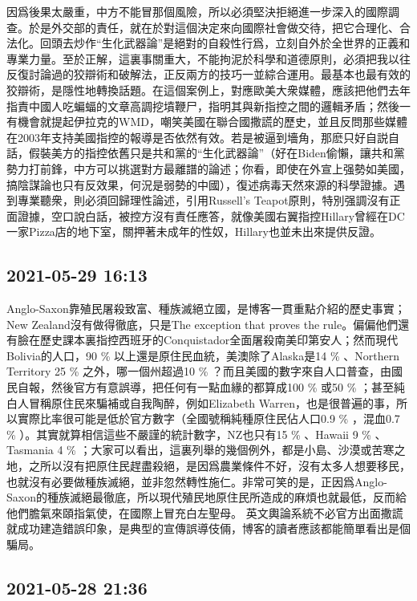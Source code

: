 \documentclass[twocolumn]{ctexart}
\begin{document}
因爲後果太嚴重，中方不能冒那個風險，所以必須堅決拒絕進一步深入的國際調查。於是外交部的責任，就在於對這個決定來向國際社會做交待，把它合理化、合法化。回頭去炒作“生化武器論”是絕對的自殺性行爲，立刻自外於全世界的正義和專業力量。至於正解，這裏事關重大，不能拘泥於科學和道德原則，必須把我以往反復討論過的狡辯術和破解法，正反兩方的技巧一並綜合運用。最基本也最有效的狡辯術，是隱性地轉換話題。在這個案例上，對應歐美大衆媒體，應該把他們去年指責中國人吃蝙蝠的文章高調挖墳鞭尸，指明其與新指控之間的邏輯矛盾；然後一有機會就提起伊拉克的WMD，嘲笑美國在聯合國撒謊的歷史，並且反問那些媒體在2003年支持美國指控的報導是否依然有效。若是被逼到墻角，那麽只好自説自話，假裝美方的指控依舊只是共和黨的“生化武器論”（好在Biden偷懶，讓共和黨勢力打前鋒，中方可以挑選對方最離譜的論述；你看，即使在外宣上强勢如美國，搞陰謀論也只有反效果，何況是弱勢的中國），復述病毒天然來源的科學證據。遇到專業聽衆，則必須回歸理性論述，引用Russell’s Teapot原則，特別强調沒有正面證據，空口說白話，被控方沒有責任應答，就像美國右翼指控Hillary曾經在DC一家Pizza店的地下室，關押著未成年的性奴，Hillary也並未出來提供反證。
\subsection*{2021-05-29 16:13}

Anglo-Saxon靠殖民屠殺致富、種族滅絕立國，是博客一貫重點介紹的歷史事實；New Zealand沒有做得徹底，只是The exception that proves the rule。偏偏他們還有臉在歷史課本裏指控西班牙的Conquistador全面屠殺南美印第安人；然而現代Bolivia的人口，90 \% 以上還是原住民血統，美澳除了Alaska是14 \% 、Northern Territory 25 \% 之外，哪一個州超過10 \% ？而且美國的數字來自人口普查，由國民自報，然後官方有意誤導，把任何有一點血緣的都算成100 \% 或50 \% ；甚至純白人冒稱原住民來騙補或自我陶醉，例如Elizabeth Warren，也是很普遍的事，所以實際比率很可能是低於官方數字（全國號稱純種原住民佔人口0.9 \% ，混血0.7 \% ）。其實就算相信這些不嚴謹的統計數字，NZ也只有15 \% 、Hawaii 9 \% 、Tasmania 4 \% ；大家可以看出，這裏列舉的幾個例外，都是小島、沙漠或苦寒之地，之所以沒有把原住民趕盡殺絕，是因爲農業條件不好，沒有太多人想要移民，也就沒有必要做種族滅絕，並非忽然轉性施仁。非常可笑的是，正因爲Anglo-Saxon的種族滅絕最徹底，所以現代殖民地原住民所造成的麻煩也就最低，反而給他們膽氣來頤指氣使，在國際上冒充白左聖母。
英文輿論系統不必官方出面撒謊就成功建造錯誤印象，是典型的宣傳誤導伎倆，博客的讀者應該都能簡單看出是個騙局。
\subsection*{2021-05-28 21:36}
\end{document}
